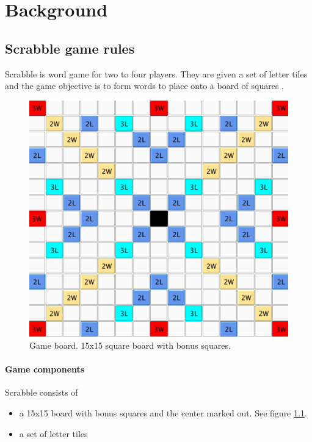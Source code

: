 \documentclass[a4paper, 12pt]{report}
\begin{document}
\chapter{Background}

\section{Scrabble game rules}
Scrabble is word game for two to four players. They are given a set of letter tiles and the game objective is to form words to place onto a board of squares \cite{ABSP} \cite{NASPA} \cite{forbund}.

\begin{figure}
\centering
\includegraphics[scale=0.5]{board}
\caption {Game board. 15x15 square board with bonus squares.}
\label{fig:game-board}
\end{figure}

\subsubsection{Game components}
Scrabble consists of 

\begin{itemize}
\item a 15x15 board with bonus squares and the center marked out. See figure \ref{fig:game-board}.
\item a set of letter tiles
\end{itemize}
\end{document}
